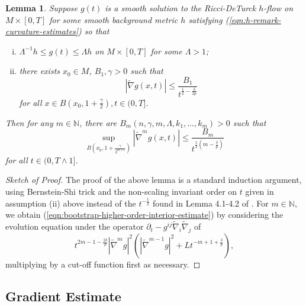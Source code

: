 \documentclass[12pt]{amsart}
\theoremstyle{plain}
\theoremstyle{plain}
\newtheorem{lemma}[subsection]{Lemma}
\theoremstyle{definition}
\theoremstyle{remark}
\numberwithin{equation}{subsection}
\newcommand{\hdel}{\tilde{\nabla}}
\begin{document}
\begin{lemma}\label{lem:estimates-bootstrap}
    Suppose $g(t)$ is a smooth solution to the Ricci-DeTurck $h$-flow on $M \times [0,T]$ for some smooth background metric $h$ satisfying (\ref{eqn:h-remark-curvature-estimates}) %
    so that
    \begin{enumerate}[(i)]
        \item $\Lambda^{-1}h \leq g(t) \leq \Lambda h$ on $M\times[0,T]$ for some $\Lambda > 1$;
        \item there exists $x_0\in M$, $B_1,\gamma>0$ such that 
        \begin{equation*}
            |\hdel g(x,t)| \leq \frac{B_1}{t^{\frac{1}{2}-\frac{\delta}{2p}}}
        \end{equation*}
        for all $x \in B\left(x_0, 1 + \frac{\gamma}{2}\right), t \in (0, T]$. 
    \end{enumerate}
 Then for any $m\in \mathbb{N}$, there are 
       $ B_m(n,\gamma, m,\Lambda,k_1,\dots,k_m) > 0$
    such that 
    \begin{equation}\label{eqn:bootstrap-higher-order-interior-estimate}
        \sup\limits_{B\left(x_0, 1 + \frac{\gamma}{2^{m+1}}\right)} |\hdel^m g(x,t)| \leq \frac{B_m}{t^{\frac{1}{2}(m-\frac{\delta}{p})}}
    \end{equation}
    for all $t \in (0, T\wedge 1]$. %
\end{lemma}

\begin{proof}[Sketch of Proof]
    The proof of the above lemma is a standard induction argument, using Bernstein-Shi trick and the non-scaling invariant order on $t$ given in assumption (ii) above instead of the $t^{-\frac{1}{2}}$ found in Lemma 4.1-4.2 of \cite{simon_deformation_2002}. For $m \in \mathbb{N}$, we obtain (\ref{eqn:bootstrap-higher-order-interior-estimate}) by considering the evolution equation under the operator $\partial_t - g^{ij}\hdel_i\hdel_j$ of 
    \begin{equation*}
        t^{2m-1-\frac{2\delta}{p}}|\hdel^m g|^2\left(|\hdel^{m-1}g|^2 + Lt^{-m+1+\frac{\delta}{p}}\right),
    \end{equation*}
    multiplying by a cut-off function first as necessary.
\end{proof}


\subsection{Gradient Estimate}
\end{document}

